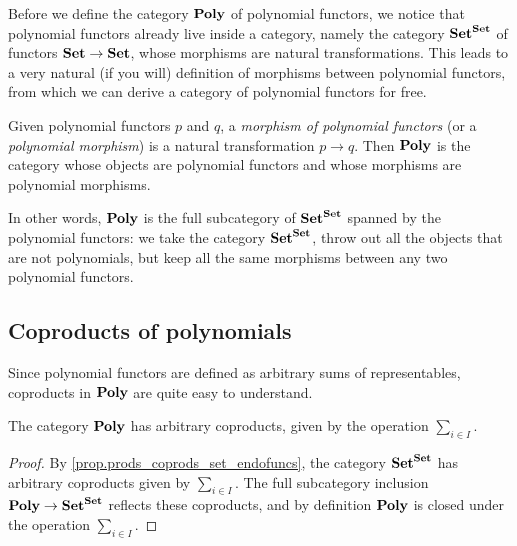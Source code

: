 \documentclass[Book-Poly]{subfiles}
\begin{document}
Before we define the category $\mathbf{Poly}$ of polynomial functors, we notice that polynomial functors already live inside a category, namely the category $\mathbf{Set}^{\mathbf{Set}}$ of functors $\mathbf{Set} \to \mathbf{Set}$, whose morphisms are natural transformations.
This leads to a very natural (if you will) definition of morphisms between polynomial functors, from which we can derive a category of polynomial functors for free.

\begin{definition}
Given polynomial functors $p$ and $q$, a \emph{morphism of polynomial functors} (or a \emph{polynomial morphism}) is a natural transformation $p\to q$.
Then $\mathbf{Poly}$ is the category whose objects are polynomial functors and whose morphisms are polynomial morphisms.
\end{definition}

In other words, $\mathbf{Poly}$ is the full subcategory of $\mathbf{Set}^{\mathbf{Set}}$ spanned by the polynomial functors: we take the category $\mathbf{Set}^{\mathbf{Set}}$, throw out all the objects that are not polynomials, but keep all the same morphisms between any two polynomial functors.

\subsection{Coproducts of polynomials}
\label{subsec.poly.func_nat.morph.coprod}

Since polynomial functors are defined as arbitrary sums of representables, coproducts in $\mathbf{Poly}$ are quite easy to understand.

\begin{proposition} \label{prop.poly_coprods}
The category $\mathbf{Poly}$ has arbitrary coproducts, given by the operation $\sum_{i \in I}$.
\end{proposition}
\begin{proof}
By \cref{prop.prods_coprods_set_endofuncs}, the category $\mathbf{Set}^{\mathbf{Set}}$ has arbitrary coproducts given by $\sum_{i \in I}$.
The full subcategory inclusion $\mathbf{Poly} \to \mathbf{Set}^{\mathbf{Set}}$ reflects these coproducts, and by definition $\mathbf{Poly}$ is closed under the operation $\sum_{i \in I}$.
\end{proof}
\end{document}
